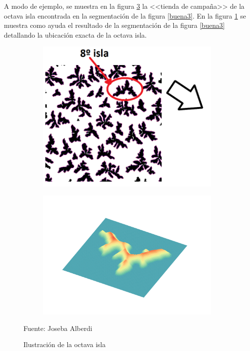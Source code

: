 A modo de ejemplo, se muestra en la figura \ref{tienda2} la <<tienda de campa\~{n}a>> de la octava isla encontrada en la segmentaci\'{o}n de la figura \ref{buena3}. En la figura \ref{tienda_aux} se muestra como ayuda el resultado de la segmentaci\'{o}n de la figura \ref{buena3} detallando la ubicaci\'{o}n exacta de la octava isla.

\begin{figure}[H]
	\captionsetup{justification=centering}
	\centering
	\begin{subfigure}[t]{2.6in}
		\centering
		\includegraphics[width=1.3\textwidth]{./imagenes/tiendaAux}
		\subcaption{}\label{tienda_aux}
	\end{subfigure}	
	\begin{subfigure}[t]{2.6in}
		\centering
		\includegraphics[width=1.45\textwidth]{./pdfs/surface_raw}	
		\subcaption{}\label{tienda2}
	\end{subfigure}
	\caption{Ilustraci\'{o}n de la octava isla }	
	Fuente: Joseba Alberdi
\end{figure}

